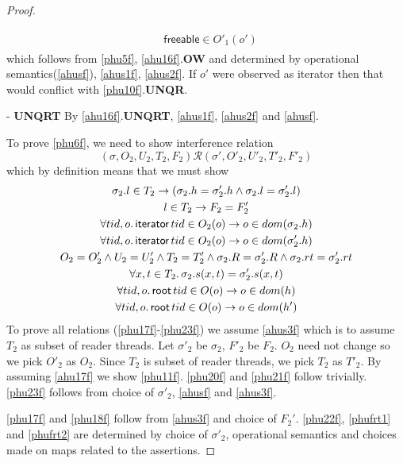 \begin{proof}
\begin{case}
\begin{gather}
\begin{aligned}
 & \textsf{freeable} \in O'_1(o')
                \end{aligned}
\end{gather}
which follows from \ref{phu5f}, \ref{ahu16f}.\textbf{OW} and determined by operational semantics(\ref{ahusf}), \ref{ahus1f}, \ref{ahus2f}.  If $o'$ were observed as \textsf{iterator} then that would conflict with \ref{phu10f}.\textbf{UNQR}.
\end{case}
\begin{case} - \textbf{UNQRT} By \ref{ahu16f}.\textbf{UNQRT}, \ref{ahus1f}, \ref{ahus2f} and \ref{ahusf}.
\end{case}

To prove \ref{phu6f}, we need to show  interference relation
\[(\sigma, O_2, U_2, T_2,F_2) \mathcal{R} (\sigma', O'_2, U'_2, T'_2,F'_2)  \]
which by definition means that we must show 
\begin{gather}\label{phu17f}
  \sigma_2.l  \in  T_2 \rightarrow (\sigma_2.h =\sigma'_2.h \land \sigma_2.l=\sigma'_2.l)\\
  \label{phu18f}
  l\in T_2\rightarrow F_2=F_2'\\
  \label{phu20f}
  \forall tid,o\ldotp\textsf{iterator} \, tid \in O_2(o) \rightarrow o \in dom(\sigma_2.h) \\
  \label{phu21f}
  \forall tid,o\ldotp\textsf{iterator} \, tid \in O_2(o) \rightarrow o \in dom(\sigma'_2.h) \\
  \label{phu22f}
  O_2 = O_2' \land U_2 = U_2' \land T_2 = T_2' \land \sigma_2.R = \sigma'_2.R \land \sigma_2.rt = \sigma'_2.rt \\
  \label{phu23f}
  \forall x, t \in T_2 \ldotp \sigma_2.s(x,t) = \sigma'_2.s(x,t) \\
    \label{phufrt1}
  \forall tid,o\ldotp\textsf{root} \, tid \in O(o) \rightarrow o \in dom(h) \\
  \label{phufrt2}
  \forall tid,o\ldotp\textsf{root} \, tid \in O(o) \rightarrow o \in dom(h') 
\end{gather}
To prove all relations (\ref{phu17f}-\ref{phu23f}) we assume \ref{ahus3f} which is to assume $T_2$ as subset of reader threads. Let $\sigma'_2$ be $\sigma_2$, $F'_2$ be $F_2$. $O_2$ need not change so we pick $O'_2$  as $O_2$. Since $T_2$ is subset of reader threads, we pick $T_2$ as  $T'_2$. By assuming \ref{ahu17f}  we show \ref{phu11f}. \ref{phu20f} and \ref{phu21f} follow trivially. \ref{phu23f} follows from choice of $\sigma'_2$,  \ref{ahusf} and \ref{ahus3f}.

\ref{phu17f} and \ref{phu18f} follow from \ref{ahus3f} and choice of $F_2'$. \ref{phu22f}, \ref{phufrt1} and \ref{phufrt2} are determined by  choice of $\sigma'_2$, operational semantics and choices made on maps related to the assertions.


\end{proof}

